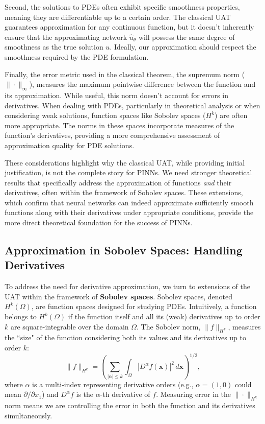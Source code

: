 Second, the solutions to PDEs often exhibit specific smoothness properties, meaning they are differentiable up to a certain order. The classical UAT guarantees approximation for any continuous function, but it doesn't inherently ensure that the approximating network $\hat{u}_\theta$ will possess the same degree of smoothness as the true solution $u$. Ideally, our approximation should respect the smoothness required by the PDE formulation.

Finally, the error metric used in the classical theorem, the supremum norm ($\|\cdot\|_\infty$), measures the maximum pointwise difference between the function and its approximation. While useful, this norm doesn't account for errors in derivatives. When dealing with PDEs, particularly in theoretical analysis or when considering weak solutions, function spaces like Sobolev spaces ($H^k$) are often more appropriate. The norms in these spaces incorporate measures of the function's derivatives, providing a more comprehensive assessment of approximation quality for PDE solutions.

These considerations highlight why the classical UAT, while providing initial justification, is not the complete story for PINNs. We need stronger theoretical results that specifically address the approximation of functions \textit{and} their derivatives, often within the framework of Sobolev spaces. These extensions, which confirm that neural networks can indeed approximate sufficiently smooth functions along with their derivatives under appropriate conditions, provide the more direct theoretical foundation for the success of PINNs.

\subsection{Approximation in Sobolev Spaces: Handling Derivatives}

To address the need for derivative approximation, we turn to extensions of the UAT within the framework of \textbf{Sobolev spaces}. Sobolev spaces, denoted $H^k(\Omega)$, are function spaces designed for studying PDEs. Intuitively, a function belongs to $H^k(\Omega)$ if the function itself and all its (weak) derivatives up to order $k$ are square-integrable over the domain $\Omega$. The Sobolev norm, $\|f\|_{H^k}$, measures the ``size" of the function considering both its values and its derivatives up to order $k$:
%
\[
    \|f\|_{H^k} = \left( \sum_{|\alpha| \leq k} \int_{\Omega} |D^\alpha f(\mathbf{x})|^2 \, d\mathbf{x} \right)^{1/2},
\]
%
where $\alpha$ is a multi-index representing derivative orders (e.g., $\alpha=(1,0)$ could mean $\partial/\partial x_1$) and $D^\alpha f$ is the $\alpha$-th derivative of $f$. Measuring error in the $\|\cdot\|_{H^k}$ norm means we are controlling the error in both the function and its derivatives simultaneously.

